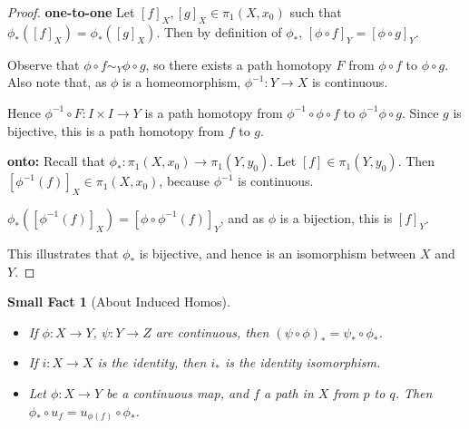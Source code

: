 \documentclass[11pt,letterpaper,boxed]{article}
\newtheorem*{smallfact}{Small Fact}
\begin{document}
\begin{proof}

{\bf one-to-one}  Let $[f]_X, [g]_X\in \pi_1(X,x_0)$ such that $\phi_* ([f]_X)=\phi_*([g]_X)$.  Then by definition of $\phi_*$, $[\phi\circ f]_Y=[\phi\circ g]_Y$.  

Observe that $\phi\circ f\sim_Y \phi\circ g$, so there exists a path homotopy $F$ from $\phi\circ f$ to $\phi\circ g$.  Also note that, as $\phi$ is a homeomorphism, $\phi^{-1}:Y\to X$ is continuous.

Hence $\phi^{-1}\circ F:I\times I \to Y$ is a path homotopy from $\phi^{-1}\circ \phi\circ f$ to $\phi^{-1}\phi\circ g.$ Since $g$ is bijective, this is a path homotopy from $f$ to $g$.

\vspace{.2in}
{\bf onto:}
Recall that $\phi_*:\pi_1(X,x_0)\to \pi_1(Y,y_0)$.  Let $[f]\in \pi_1(Y,y_0)$.  Then $[\phi^{-1}(f)]_X\in \pi_1(X,x_0)$, because $\phi^{-1}$ is continuous.

$\phi_*([\phi^{-1}(f)]_X)=[\phi\circ \phi^{-1}(f)]_Y$, and as $\phi$ is a bijection, this is $[f]_Y$.  

This illustrates that $\phi_*$ is bijective, and hence is an isomorphism between $X$ and $Y$.  
\end{proof}

\vspace{.3in}
\begin{smallfact}[About Induced Homos]
\begin{itemize}
\item If $\phi:X\to Y$, $\psi:Y\to Z$ are continuous, then $(\psi\circ \phi)_*=\psi_*\circ \phi_*$.

\item If $i:X\to X$ is the identity, then $i_*$ is the identity isomorphism.

\item Let $\phi:X\to Y$ be a continuous map, and $f$ a path in $X$ from $p$ to $q$.  Then $\phi_*\circ u_f=u_{\phi(f)}\circ \phi_*$.
\end{itemize}
\end{smallfact}
\end{document}
